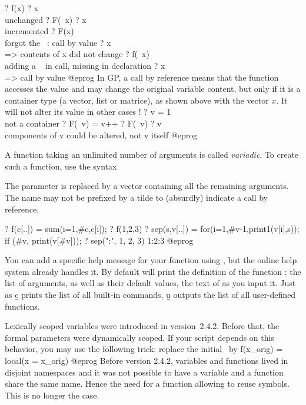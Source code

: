   ? f(x)
  ? x      \\ unchanged
  ? F(~x)
  ? x      \\ incremented
  ? F(x)   \\ forgot the ~: call by value
  ? x      \\ => contents of x did not change
  ? f(~x)  \\ adding a ~ in call, missing in declaration
  ? x      \\ => call by value
@eprog
 In GP, a call by reference means that the function
accesses the value and may change the original variable content, but only if
it is a container type (a vector, list or matrice), as shown above with the
vector $x$. It will not alter its value in other cases !
\bprog
  ? v = 1  \\ not a container
  ? F(~v) = v++
  ? F(~v)
  ? v \\ components of v could be altered, not v itself
@eprog


A function taking an unlimited number of arguments is called \emph{variadic}.
To create such a function, use the syntax


\noindent The parameter  is replaced by a vector containing all the
remaining arguments. The name may not be prefixed by a tilde to (absurdly)
indicate a call by reference.

\bprog
? f(c[..]) = sum(i=1,#c,c[i]);
? f(1,2,3)
? sep(s,v[..]) = for(i=1,#v-1,print1(v[i],s)); if (#v, print(v[#v]));
? sep(":", 1, 2, 3)
1:2:3
@eprog

You can add a specific help message for your function using ,
but the online help system already handles it. By default 
will print the definition of the function : the list of arguments,
as well as their default values, the text of  as you input it.
Just as \b{c} prints the list of all built-in commands, \b{u} outputs the
list of all user-defined functions.

 Lexically scoped
variables were introduced in version~2.4.2. Before that, the formal
parameters were dynamically scoped. If your script depends on this behavior,
you may use the following trick: replace the initial  \ by
\bprog
f(x_orig) = local(x = x_orig)
@eprog
 Before version
2.4.2, variables and functions lived in disjoint namespaces and it was not
possible to have a variable and a function share the same name. Hence the
need for a  function allowing to reuse symbols. This is no longer
the case.

